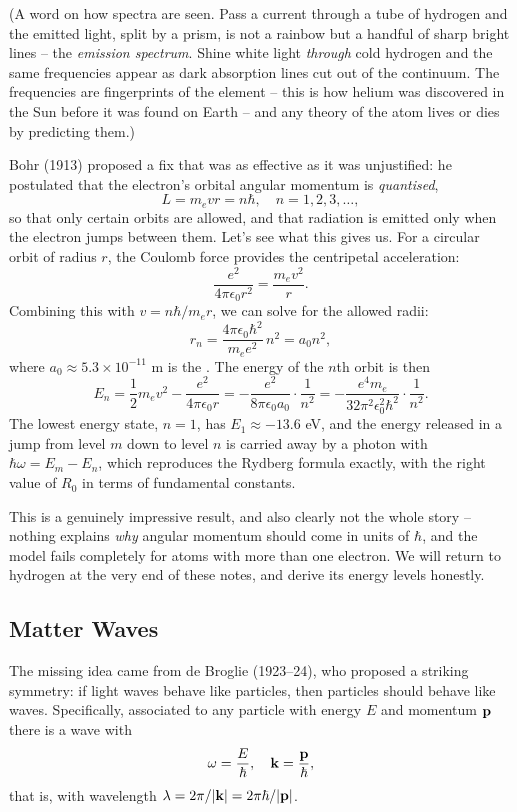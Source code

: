 \documentclass[a4paper]{scrartcl}
\begin{document}
(A word on how spectra are seen. Pass a current through a tube of hydrogen and the emitted light, split by a prism, is not a rainbow but a handful of sharp bright lines -- the \emph{emission spectrum}. Shine white light \emph{through} cold hydrogen and the same frequencies appear as dark absorption lines cut out of the continuum. The frequencies are fingerprints of the element -- this is how helium was discovered in the Sun before it was found on Earth -- and any theory of the atom lives or dies by predicting them.)

Bohr (1913) proposed a fix that was as effective as it was unjustified: he postulated that the electron's orbital angular momentum is \emph{quantised},
$$
L = m_e v r = n \hbar, \quad n = 1, 2, 3, \dots,
$$
so that only certain orbits are allowed, and that radiation is emitted only when the electron jumps between them. Let's see what this gives us. For a circular orbit of radius $r$, the Coulomb force provides the centripetal acceleration:
$$
\frac{e^2}{4 \pi \epsilon_0 r^2} = \frac{m_e v^2}{r}.
$$
Combining this with $v = n \hbar / m_e r$, we can solve for the allowed radii:
$$
r_n = \frac{4 \pi \epsilon_0 \hbar^2}{m_e e^2} \, n^2 = a_0 n^2,
$$
where $a_0 \approx 5.3 \times 10^{-11}$ m is the . The energy of the $n$th orbit is then
$$
E_n = \frac{1}{2} m_e v^2 - \frac{e^2}{4 \pi \epsilon_0 r} = -\frac{e^2}{8 \pi \epsilon_0 a_0} \cdot \frac{1}{n^2} = - \frac{e^4 m_e}{32 \pi^2 \epsilon_0^2 \hbar^2} \cdot \frac{1}{n^2}.
$$
The lowest energy state, $n = 1$, has $E_1 \approx -13.6$ eV, and the energy released in a jump from level $m$ down to level $n$ is carried away by a photon with $\hbar \omega = E_m - E_n$, which reproduces the Rydberg formula exactly, with the right value of $R_0$ in terms of fundamental constants.

This is a genuinely impressive result, and also clearly not the whole story -- nothing explains \emph{why} angular momentum should come in units of $\hbar$, and the model fails completely for atoms with more than one electron. We will return to hydrogen at the very end of these notes, and derive its energy levels honestly.

\subsection{Matter Waves}

The missing idea came from de Broglie (1923--24), who proposed a striking symmetry: if light waves behave like particles, then particles should behave like waves. Specifically, associated to any particle with energy $E$ and momentum $\mathbf{p}$ there is a wave with
$$
\omega = \frac{E}{\hbar}, \quad \mathbf{k} = \frac{\mathbf{p}}{\hbar},
$$
that is, with wavelength $\lambda = 2 \pi / |\mathbf{k}| = 2 \pi \hbar / |\mathbf{p}|$.
\end{document}
